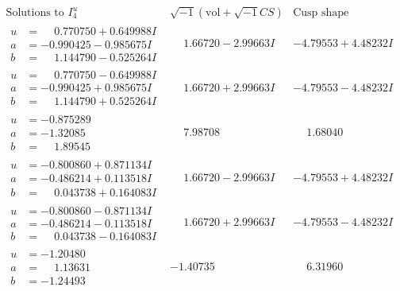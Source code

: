 \documentclass[1p]{elsarticle_modified}
\theoremstyle{definition}
\newcommand{\I}{\sqrt{-1}}
\begin{document}
$$\begin{array}{c|c|c}  
\text{Solutions to }I^u_{4}& \I (\text{vol} + \sqrt{-1}CS) & \text{Cusp shape}\\
 \hline 
\begin{aligned}
u &= \phantom{-}0.770750 + 0.649988 I \\
a &= -0.990425 - 0.985675 I \\
b &= \phantom{-}1.144790 - 0.525264 I\end{aligned}
 & \phantom{-}1.66720 - 2.99663 I & -4.79553 + 4.48232 I \\ \hline\begin{aligned}
u &= \phantom{-}0.770750 - 0.649988 I \\
a &= -0.990425 + 0.985675 I \\
b &= \phantom{-}1.144790 + 0.525264 I\end{aligned}
 & \phantom{-}1.66720 + 2.99663 I & -4.79553 - 4.48232 I \\ \hline\begin{aligned}
u &= -0.875289\phantom{ +0.000000I} \\
a &= -1.32085\phantom{ +0.000000I} \\
b &= \phantom{-}1.89545\phantom{ +0.000000I}\end{aligned}
 & \phantom{-}7.98708\phantom{ +0.000000I} & \phantom{-}1.68040\phantom{ +0.000000I} \\ \hline\begin{aligned}
u &= -0.800860 + 0.871134 I \\
a &= -0.486214 + 0.113518 I \\
b &= \phantom{-}0.043738 + 0.164083 I\end{aligned}
 & \phantom{-}1.66720 - 2.99663 I & -4.79553 + 4.48232 I \\ \hline\begin{aligned}
u &= -0.800860 - 0.871134 I \\
a &= -0.486214 - 0.113518 I \\
b &= \phantom{-}0.043738 - 0.164083 I\end{aligned}
 & \phantom{-}1.66720 + 2.99663 I & -4.79553 - 4.48232 I \\ \hline\begin{aligned}
u &= -1.20480\phantom{ +0.000000I} \\
a &= \phantom{-}1.13631\phantom{ +0.000000I} \\
b &= -1.24493\phantom{ +0.000000I}\end{aligned}
 & -1.40735\phantom{ +0.000000I} & \phantom{-}6.31960\phantom{ +0.000000I} \\ \hline\begin{aligned}

\end{aligned}
\end{array}$$
\end{document}
